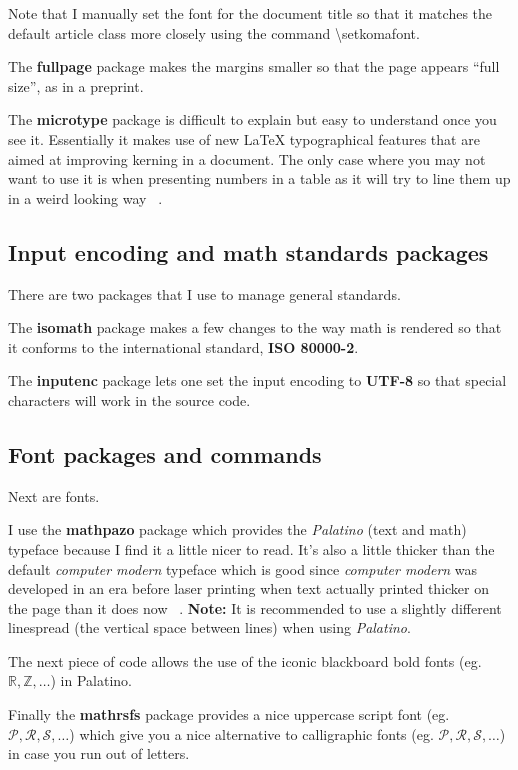       Note that I manually set the font for the document title so that it matches the default article class more closely using the command \textbackslash setkomafont.

      The \textbf{fullpage} package makes the margins smaller so that the page appears ``full size'', as in a preprint.

      The \textbf{microtype} package is difficult to explain but easy to understand once you see it. Essentially it makes use of new \LaTeX{} typographical features that are aimed at improving kerning in a document. The only case where you may not want to use it is when presenting numbers in a table as it will try to line them up in a weird looking way ~\cite{Khirevich}.

    \subsection{Input encoding and math standards packages}
      There are two packages that I use to manage general standards.

      The \textbf{isomath} package makes a few changes to the way math is rendered so that it conforms to the international standard, \textbf{ISO 80000-2}.

      The \textbf{inputenc} package lets one set the input encoding to \textbf{UTF-8} so that special characters will work in the source code.

    \subsection{Font packages and commands}
      Next are fonts.

      I use the \textbf{mathpazo} package which provides the \textit{Palatino} (text and math) typeface because I find it a little nicer to read. It's also a little thicker than the default \textit{computer modern} typeface which is good since \textit{computer modern} was developed in an era before laser printing when text actually printed thicker on the page than it does now ~\cite{fatmodern}. \textbf{Note:} It is recommended to use a slightly different linespread (the vertical space between lines) when using \textit{Palatino}.

      The next piece of code allows the use of the iconic blackboard bold fonts (eg. $\mathbb{R},\mathbb{Z},\ldots$) in Palatino.

      Finally the \textbf{mathrsfs} package provides a nice uppercase script font (eg. $\mathscr{P},\mathscr{R},\mathscr{S},\ldots$) which give you a nice alternative to calligraphic fonts (eg. $\mathcal{P},\mathcal{R},\mathcal{S},\ldots$) in case you run out of letters.
    
